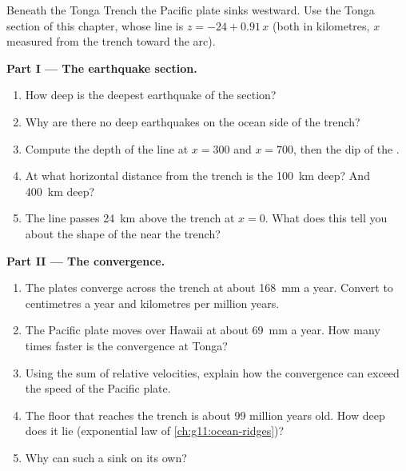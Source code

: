 \begin{problem}
\label{pb:g11:subduction-zones:1}
Beneath the Tonga Trench the Pacific plate sinks westward. Use the Tonga
section of this chapter, whose line is $z = -24 + 0.91\,x$ (both in
kilometres, $x$ measured from the trench toward the arc).

\medskip
\noindent\textbf{Part I --- The earthquake section.}
\begin{enumerate}
  \item How deep is the deepest earthquake of the section?
  \item Why are there no deep earthquakes on the ocean side of the trench?
  \item Compute the depth of the line at $x = 300$ and $x = 700$, then the
        dip of the .
  \item At what horizontal distance from the trench is the 
        \qty{100}{km} deep? And \qty{400}{km} deep?
  \item The line passes \qty{24}{km} above the trench at $x = 0$. What does
        this tell you about the shape of the  near the trench?
\end{enumerate}

\medskip
\noindent\textbf{Part II --- The convergence.}
\begin{enumerate}[resume]
  \item The plates converge across the trench at about \qty{168}{mm} a year.
        Convert to centimetres a year and kilometres per million years.
  \item The Pacific plate moves over Hawaii at about \qty{69}{mm} a year.
        How many times faster is the convergence at Tonga?
  \item Using the sum of relative velocities, explain how the convergence can
        exceed the speed of the Pacific plate.
  \item The floor that reaches the trench is about 99 million years old. How
        deep does it lie (exponential law of \cref{ch:g11:ocean-ridges})?
  \item Why can such a  sink on its own?
\end{enumerate}


\end{problem}
